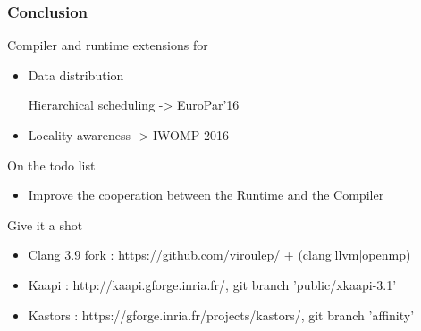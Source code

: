 \documentclass[xcolor={usenames,dvipsnames,svgnames,table}, aspectratio=43]{beamer}
\begin{document}
\begin{frame}
  \frametitle{Conclusion}

  \begin{block}{Compiler and runtime extensions for}
    \begin{itemize}
      \item Data distribution

      Hierarchical scheduling -> EuroPar'16
      \item Locality awareness -> IWOMP 2016
    \end{itemize}
  \end{block}

  \begin{block}{On the todo list}
    \begin{itemize}
      \item Improve the cooperation between the Runtime and the Compiler
    \end{itemize}
  \end{block}

\begin{block}{Give it a shot}
  \begin{itemize}
    \item Clang 3.9 fork : https://github.com/viroulep/ + (clang|llvm|openmp)
    \item Kaapi : http://kaapi.gforge.inria.fr/, git branch 'public/xkaapi-3.1'
    \item Kastors : https://gforge.inria.fr/projects/kastors/, git branch 'affinity'
  \end{itemize}
\end{block}

\end{frame}




\end{document}
